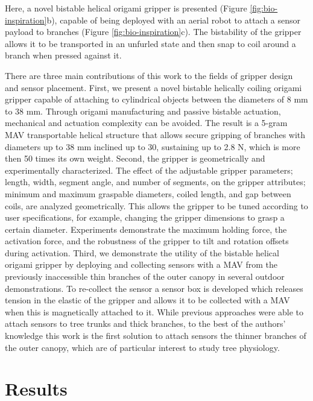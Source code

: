 Here, a novel bistable helical origami gripper is presented (Figure \ref{fig:bio-inspiration}b), capable of being deployed with an  aerial robot to attach a sensor payload to branches (Figure \ref{fig:bio-inspiration}c). The bistability of the gripper allows it to be transported in an unfurled state and then snap to coil around a branch when pressed against it.

There are three main contributions of this work to the fields of gripper design and sensor placement. First, we present a novel bistable helically coiling origami gripper capable of attaching to cylindrical objects between the diameters of 8 mm to 38 mm. Through origami manufacturing and passive bistable actuation, mechanical and actuation complexity can be avoided. The result is a 5-gram MAV transportable helical structure that allows secure gripping of branches with diameters up to 38 mm inclined up to \mbox{30\degree}, sustaining up to 2.8 N, which is more then 50 times its own weight. Second, the gripper is geometrically and experimentally characterized. The effect of the adjustable gripper parameters; length, width, segment angle, and number of segments, on the gripper attributes; minimum and maximum graspable diameters, coiled length, and gap between coils, are analyzed geometrically. This allows the gripper to be tuned according to user specifications, for example, changing the gripper dimensions to grasp a certain diameter. Experiments demonstrate the maximum holding force, the activation force, and the robustness of the gripper to tilt and rotation offsets during activation. Third, we demonstrate the utility of the bistable helical origami gripper by deploying and collecting sensors with a MAV from the previously inaccessible thin branches of the outer canopy in several outdoor demonstrations. To re-collect the sensor a sensor box is developed which releases tension in the elastic of the gripper and allows it to be collected with a MAV when this is magnetically attached to it. While previous approaches were able to attach sensors to tree trunks and thick branches, to the best of the authors' knowledge this work is the first solution to attach sensors the thinner branches of the outer canopy, which are of particular interest to study tree physiology.


\section{Results}

